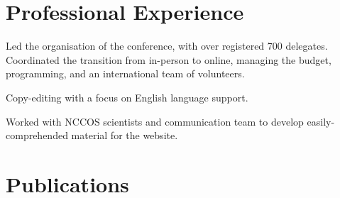 \documentclass[a4paper]{deedy-resume} %
\begin{document}
\begin{flushleft}
\sectionspace %
\sectionspace





\section{Professional Experience}


Led the organisation of the conference, with over registered 700 delegates. Coordinated the transition from in-person to online, managing the budget, programming, and an international team of volunteers.

\sectionspace



Copy-editing with a focus on English language support.

\sectionspace



Worked with NCCOS scientists and communication team to develop easily-comprehended material for the website.

\sectionspace %
\sectionspace %



\section{Publications} 


\end{flushleft}
\end{document}
